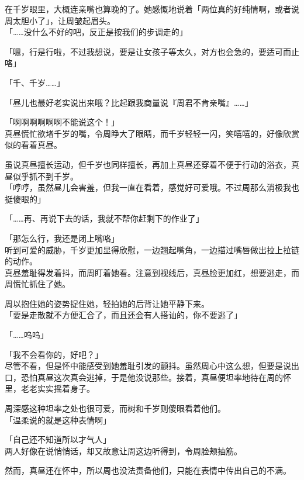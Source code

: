 在千岁眼里，大概连亲嘴也算晚的了。她感慨地说着「两位真的好纯情啊，或者说周太胆小了」，让周皱起眉头。\\

「……没什么不好的吧，反正是按我们的步调走的」

「嗯，行是行啦，不过我想说，要是让女孩子等太久，对方也会急的，要适可而止咯」

「千、千岁……」

「昼儿也最好老实说出来哦？比起跟我商量说『周君不肯亲嘴』……」

「啊啊啊啊啊啊不能说这个！」\\

真昼慌忙欲堵千岁的嘴，令周睁大了眼睛，而千岁轻轻一闪，笑嘻嘻的，好像欣赏似的看着真昼。

虽说真昼擅长运动，但千岁也同样擅长，再加上真昼还穿着不便于行动的浴衣，真昼似乎抓不到千岁。\\

「哼哼，虽然昼儿会害羞，但我一直在看着，感觉好可爱哦。不过周那么消极我也挺傻眼的」

「……再、再说下去的话，我就不帮你赶剩下的作业了」

「那怎么行，我还是闭上嘴咯」\\

听到可爱的威胁，千岁更加显得欣慰，一边翘起嘴角，一边描过嘴唇做出拉上拉链的动作。\\

真昼羞耻得发着抖，而周盯着她看。注意到视线后，真昼脸更加红，想要逃走，而周慌忙抓住了她。

周以抱住她的姿势捉住她，轻拍她的后背让她平静下来。\\

「要是走散就不方便汇合了，而且还会有人搭讪的，你不要逃了」

「……呜呜」

「我不会看你的，好吧？」\\

尽管不看，但是怀中能感受到她羞耻引发的颤抖。虽然周心中这么想，但要是说出口，恐怕真昼这次真会逃掉，于是他没说那些。接着，真昼便坦率地待在周的怀里，老老实实摇着身子。

周深感这种坦率之处也很可爱，而树和千岁则傻眼看着他们。\\

「温柔说的就是这种表情啊」

「自己还不知道所以才气人」\\

两人好像在说悄悄话，却又故意让周这边听得到，令周脸颊抽筋。

然而，真昼还在怀中，所以周也没法责备他们，只能在表情中传出自己的不满。
